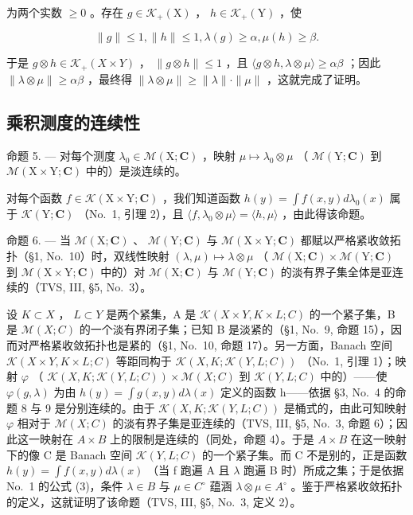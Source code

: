 为两个实数 \(\geqslant 0\) 。存在 \(g\in \mathcal{K}_{+}(\mathrm{X})\) ， \(h\in \mathcal{K}_{+}(\mathrm{Y})\) ，使

\[
\| g \| \leqslant 1, \| h \| \leqslant 1, \lambda (g) \geqslant \alpha , \mu (h) \geqslant \beta .
\]

于是 \(g \otimes h \in \mathcal{K}_{+}(X \times Y)\) ， \(\| g \otimes h \| \leqslant 1\) ，且 \(\langle g \otimes h, \lambda \otimes \mu \rangle \geqslant \alpha \beta\) ；因此 \(\| \lambda \otimes \mu \| \geqslant \alpha \beta\) ，最终得 \(\| \lambda \otimes \mu \| \geqslant \| \lambda \| \cdot \| \mu \|\) ，这就完成了证明。

\subsection{乘积测度的连续性}

命题 5. --- 对每个测度 \(\lambda_0 \in \mathcal{M}(\mathrm{X};\mathbf{C})\) ，映射 \(\mu \mapsto \lambda_0 \otimes \mu\) （ \(\mathcal{M}(\mathrm{Y};\mathbf{C})\) 到 \(\mathcal{M}(\mathrm{X} \times \mathrm{Y};\mathbf{C})\) 中的）是淡连续的。

对每个函数 \(f \in \mathcal{K}(\mathrm{X} \times \mathrm{Y}; \mathbf{C})\) ，我们知道函数 \(h(y) = \int f(x, y) d\lambda_0(x)\) 属于 \(\mathcal{K}(\mathrm{Y}; \mathbf{C})\) （No.~1, 引理 2），且 \(\langle f, \lambda_0 \otimes \mu \rangle = \langle h, \mu \rangle\) ，由此得该命题。

命题 6. --- 当 \(\mathcal{M}(\mathrm{X};\mathbf{C})\) 、 \(\mathcal{M}(\mathrm{Y};\mathbf{C})\) 与 \(\mathcal{M}(\mathrm{X}\times\mathrm{Y};\mathbf{C})\) 都赋以严格紧收敛拓扑（§1, No.~10）时，双线性映射 \((\lambda,\mu)\mapsto\lambda\otimes\mu\) （ \(\mathcal{M}(\mathrm{X};\mathbf{C})\times\mathcal{M}(\mathrm{Y};\mathbf{C})\) 到 \(\mathcal{M}(\mathrm{X}\times\mathrm{Y};\mathbf{C})\) 中的）对 \(\mathcal{M}(\mathrm{X};\mathbf{C})\) 与 \(\mathcal{M}(\mathrm{Y};\mathbf{C})\) 的淡有界子集全体是亚连续的（TVS, III, §5, No.~3）。

设 \(K \subset X\) ， \(L \subset Y\) 是两个紧集，A 是 \(\mathcal{K}(X \times Y, K \times L; C)\) 的一个紧子集，B 是 \(\mathcal{M}(X; C)\) 的一个淡有界闭子集；已知 B 是淡紧的（§1, No.~9, 命题 15），因而对严格紧收敛拓扑也是紧的（§1, No.~10, 命题 17）。另一方面，Banach 空间 \(\mathcal{K}(X \times Y, K \times L; C)\) 等距同构于 \(\mathcal{K}(X, K; \mathcal{K}(Y, L; C))\) （No.~1, 引理 1）；映射 \(\varphi\) （ \(\mathcal{K}(X, K; \mathcal{K}(Y, L; C)) \times \mathcal{M}(X; C)\) 到 \(\mathcal{K}(Y, L; C)\) 中的）——使 \(\varphi(g, \lambda)\) 为由 \(h(y) = \int g(x, y) d\lambda(x)\) 定义的函数 h——依据 §3, No.~4 的命题 8 与 9 是分别连续的。由于 \(\mathcal{K}(X, K; \mathcal{K}(Y, L; C))\) 是桶式的，由此可知映射 \(\varphi\) 相对于 \(\mathcal{M}(X; C)\) 的淡有界子集是亚连续的（TVS, III, §5, No.~3, 命题 6）；因此这一映射在 \(A \times B\) 上的限制是连续的（同处，命题 4）。于是 \(A \times B\) 在这一映射下的像 C 是 Banach 空间 \(\mathcal{K}(Y, L; C)\) 的一个紧子集。而 C 不是别的，正是函数 \(h(y) = \int f(x, y) d\lambda(x)\) （当 f 跑遍 A 且 \(\lambda\) 跑遍 B 时）所成之集；于是依据 No.~1 的公式 (3)，条件 \(\lambda \in B\) 与 \(\mu \in C^{\circ}\) 蕴涵 \(\lambda \otimes \mu \in A^{\circ}\) 。鉴于严格紧收敛拓扑的定义，这就证明了该命题（TVS, III, §5, No.~3, 定义 2）。

